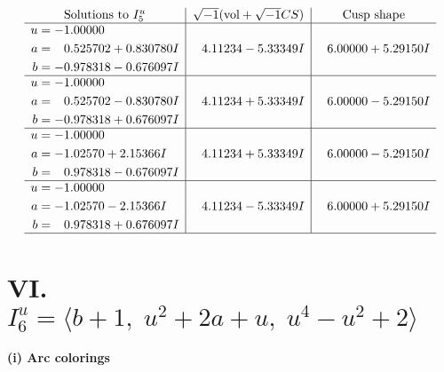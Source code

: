 \documentclass[1p]{elsarticle_modified}
\theoremstyle{definition}
\newcommand{\I}{\sqrt{-1}}
\begin{document}
$$\begin{array}{c|c|c}  
\text{Solutions to }I^u_{5}& \I (\text{vol} + \sqrt{-1}CS) & \text{Cusp shape}\\
 \hline 
\begin{aligned}
u &= -1.00000\phantom{ +0.000000I} \\
a &= \phantom{-}0.525702 + 0.830780 I \\
b &= -0.978318 - 0.676097 I\end{aligned}
 & \phantom{-}4.11234 - 5.33349 I & \phantom{-}6.00000 + 5.29150 I \\ \hline\begin{aligned}
u &= -1.00000\phantom{ +0.000000I} \\
a &= \phantom{-}0.525702 - 0.830780 I \\
b &= -0.978318 + 0.676097 I\end{aligned}
 & \phantom{-}4.11234 + 5.33349 I & \phantom{-}6.00000 - 5.29150 I \\ \hline\begin{aligned}
u &= -1.00000\phantom{ +0.000000I} \\
a &= -1.02570 + 2.15366 I \\
b &= \phantom{-}0.978318 - 0.676097 I\end{aligned}
 & \phantom{-}4.11234 + 5.33349 I & \phantom{-}6.00000 - 5.29150 I \\ \hline\begin{aligned}
u &= -1.00000\phantom{ +0.000000I} \\
a &= -1.02570 - 2.15366 I \\
b &= \phantom{-}0.978318 + 0.676097 I\end{aligned}
 & \phantom{-}4.11234 - 5.33349 I & \phantom{-}6.00000 + 5.29150 I\\
 \hline 
 \end{array}$$\newpage\newpage\renewcommand{\arraystretch}{1}
\centering \section*{VI. $I^u_{6}= \langle b+1,\;u^2+2 a+u,\;u^4- u^2+2 \rangle$}
\flushleft \textbf{(i) Arc colorings}\\
\end{document}
